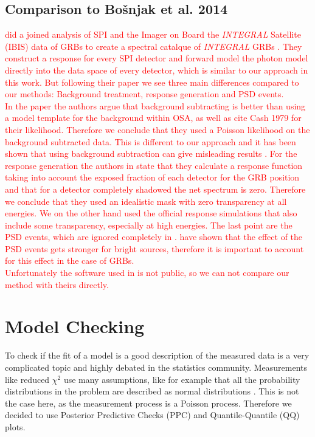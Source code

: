 \documentclass[twocolumn,traditabstract]{aa}
\newcommand{\BB}[1]{\textcolor{red}{\textsf{#1}}}
\begin{document}
\subsection{Comparison to Bo{\v{s}}njak et al. 2014}

\BB{\citet{Bosnjak-2014} did a joined analysis of SPI and the Imager on Board the \textit{INTEGRAL} Satellite (IBIS) data of GRBs to create a spectral catalque of \textit{INTEGRAL} GRBs \citep{Ubertini-2003}. They construct a response for every SPI detector and forward model the photon model directly into the data space of every detector, which is similar to our approach in this work. But following their paper we see three main differences compared to our methods: Background treatment, response generation and PSD events.\\
In the paper the authors argue that background subtracting is better than using a model template for the background within OSA, as well as cite Cash 1979 \citep{Cash-1979} for their likelihood. Therefore we conclude that they used a Poisson likelihood on the background subtracted data. This is different to our approach and it has been shown that using background subtraction can give misleading results \citep[e.g.][]{Greiner-2016}. For the response generation the authors in \citet{Bosnjak-2014} state that they calculate a response function taking into account the exposed fraction of each detector for the GRB position and that for a detector completely shadowed the net spectrum is zero. Therefore we conclude that they used an idealistic mask with zero transparency at all energies. We on the other hand used the official response simulations that also include some transparency, especially at high energies. The last point are the PSD events, which are ignored completely in \citet{Bosnjak-2014}. \citet{spi_electronic_noise} have shown that the effect of the PSD events gets stronger for bright sources, therefore it is important to account for this effect in the case of GRBs.\\
Unfortunately the software used in \citet{Bosnjak-2014} is not public, so we can not compare our method with theirs directly.}


\section{Model Checking}
\label{PPC}
To check if the fit of a model is a good description of the measured data is a very complicated topic and highly debated in the statistics community. Measurements like reduced $\chi^{2}$ use many assumptions, like for example that all the probability distributions in the problem are described as normal distributions \citep{dosanddonts}. This is not the case here, as the measurement process is a Poisson process. Therefore we decided to use Posterior Predictive Checks (PPC) and Quantile-Quantile (QQ) plots.
\end{document}
